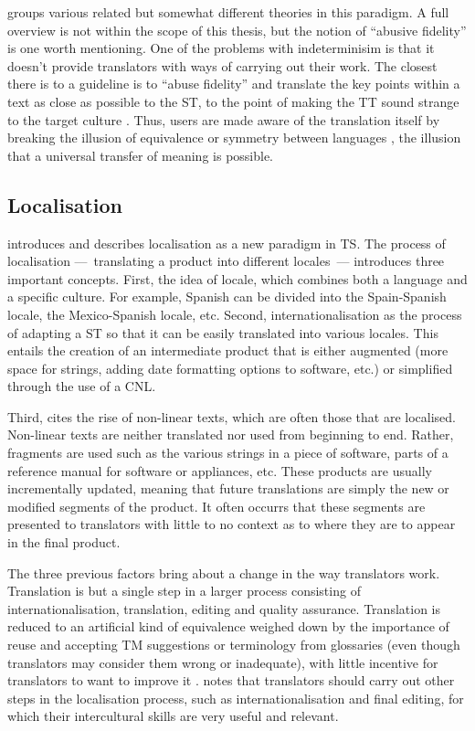 \textcite{pym2009exploring} groups various related but somewhat different theories in this paradigm. A full overview is not within the scope of this thesis, but the notion of ``abusive fidelity'' \parencite{lewis1985measure} is one worth mentioning. One of the problems with indeterminisim is that it doesn't provide translators with ways of carrying out their work. The closest there is to a guideline is to ``abuse fidelity'' and translate the key points within a text as close as possible to the \ac{ST}, to the point of making the \ac{TT} sound strange to the target culture \parencite{lewis1985measure}. Thus, users are made aware of the translation itself by breaking the illusion of equivalence or symmetry between languages \parencite{snell1988translation}, the illusion that a universal transfer of meaning is possible.

\subsection{Localisation}
\label{sub:localisation}

\noindent \textcite{pym2009exploring} introduces and describes localisation as a new paradigm in \ac{TS}. The process of localisation ---~translating a product into different locales~--- introduces three important concepts. First, the idea of locale, which combines both a language and a specific culture. For example, Spanish can be divided into the Spain-Spanish locale, the Mexico-Spanish locale, etc. Second, internationalisation as the process of adapting a \ac{ST} so that it can be easily translated into various locales. This entails the creation of an intermediate product that is either augmented (more space for strings, adding date formatting options to software, etc.) or simplified through the use of a \ac{CNL}.

Third, \textcite{pym2009exploring} cites the rise of non-linear texts, which are often those that are localised. Non-linear texts are neither translated nor used from beginning to end. Rather, fragments are used such as the various strings in a piece of software, parts of a reference manual for software or appliances, etc. These products are usually incrementally updated, meaning that future translations are simply the new or modified segments of the product. It often occurrs that these segments are presented to translators with little to no context as to where they are to appear in the final product.

The three previous factors bring about a change in the way translators work. Translation is but a single step in a larger process consisting of internationalisation, translation, editing and quality assurance. Translation is reduced to an artificial kind of equivalence weighed down by the importance of reuse and accepting \acl{TM} suggestions or terminology from glossaries (even though translators may consider them wrong or inadequate), with little incentive for translators to want to improve it \parencite{pym2009exploring}. \textcite{esselink2002localisation} notes that translators should carry out other steps in the localisation process, such as internationalisation and final editing, for which their intercultural skills are very useful and relevant.

